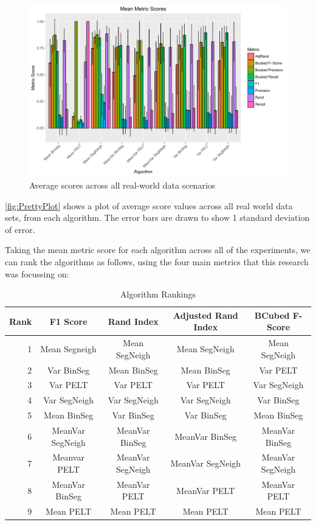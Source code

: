\documentclass[../main.tex]{subfiles}
\begin{document}
\begin{figure}[h]
    \includegraphics[width=\textwidth]{figures/PrettyPlot}
    \caption{Average scores across all real-world data scenarios}
    \label{fig:PrettyPlot}
\end{figure}

\autoref{fig:PrettyPlot} shows a plot of average score values across all real world data sets, from each algorithm. The error bars are drawn to show 1 standard deviation of error.

Taking the mean metric score for each algorithm across all of the experiments, we can rank the algorithms as follows, using the four main metrics that this research was focussing on:

\begin{table}[h]
\centering
\begin{tabular}{@{}rcccc@{}}
\toprule
\textbf{Rank} & \textbf{F1 Score} & \textbf{Rand Index} & \textbf{Adjusted Rand Index} & \textbf{BCubed F-Score} \\ \midrule
1 & Mean Segneigh & Mean SegNeigh & Mean SegNeigh & Mean SegNeigh \\
2 & Var BinSeg & Mean BinSeg & Mean BinSeg & Var PELT \\
3 & Var PELT & Var PELT & Var PELT & Var SegNeigh \\
4 & Var SegNeigh & Var SegNeigh & Var SegNeigh & Var BinSeg \\
5 & Mean BinSeg & Var BinSeg & Var BinSeg & Mean BinSeg \\
6 & MeanVar SegNeigh & MeanVar BinSeg & MeanVar BinSeg & MeanVar BinSeg \\
7 & Meanvar PELT & MeanVar SegNeigh & MeanVar SegNeigh & MeanVar SegNeigh \\
8 & MeanVar BinSeg & MeanVar PELT & MeanVar PELT & MeanVar PELT \\
9 & Mean PELT & Mean PELT & Mean PELT & Mean PELT \\ \bottomrule
\end{tabular}
\caption{Algorithm Rankings}
\label{tab:rankings}
\end{table}
\end{document}
